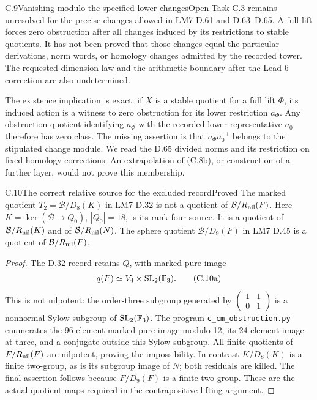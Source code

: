\begin{statement}{C.9}{Vanishing modulo the specified lower changes}{Open}
Task C.3 remains unresolved for the precise changes
allowed in LM7 D.61 and D.63--D.65.
A full lift forces zero obstruction after all changes
induced by its restrictions to stable quotients.
It has not been proved that those changes equal the
particular derivations, norm words, or homology
changes admitted by the recorded tower.
The requested dimension law and the arithmetic
boundary after the Lead 6 correction are also
undetermined.
\end{statement}

The existence implication is exact: if \(X\) is a
stable quotient for a full lift \(\Phi\), its induced
action is a witness to zero obstruction for its
lower restriction \(a_\Phi\).
Any obstruction quotient identifying \(a_\Phi\)
with the recorded lower representative \(a_0\)
therefore has zero class. The missing assertion is
that \(a_\Phi a_0^{-1}\) belongs to the stipulated
change module. We read the D.65 divided norms and
its restriction on fixed-homology corrections.
An extrapolation of (C.8b), or construction of a
further layer, would not prove this membership.

\begin{statement}{C.10}{The correct relative source for the excluded record}{Proved}
The marked quotient \(T_2=\mathcal B/D_8(K)\) in
LM7 D.32 is not a quotient of
\(\mathcal B/R_{\rm nil}(F)\).
Here \(K=\ker(\mathcal B\to Q_0)\), \(|Q_0|=18\),
is its rank-four source.
It is a quotient of \(\mathcal B/R_{\rm nil}(K)\)
and of \(\mathcal B/R_{\rm nil}(N)\).
The sphere quotient \(\mathcal B/D_9(F)\) in
LM7 D.45 is a quotient of
\(\mathcal B/R_{\rm nil}(F)\).
\end{statement}
\begin{proof}
The D.32 record retains \(Q\), with marked pure image
\[
 q(F)\simeq V_4\times{\rm SL}_2(\mathbb F_3).
 \tag{C.10a}
\]
This is not nilpotent: the order-three subgroup
generated by
\(\left(\begin{smallmatrix}1&1\\0&1\end{smallmatrix}\right)\)
is a nonnormal Sylow subgroup of
\({\rm SL}_2(\mathbb F_3)\).
The program \texttt{c\_cm\_obstruction.py} enumerates
the 96-element marked pure image modulo 12, its
24-element image at three, and a conjugate outside
this Sylow subgroup.
All finite quotients of \(F/R_{\rm nil}(F)\)
are nilpotent, proving the impossibility.
In contrast \(K/D_8(K)\) is a finite two-group,
as is its subgroup image of \(N\); both residuals
are killed. The final assertion follows because
\(F/D_9(F)\) is a finite two-group.
These are the actual quotient maps required in
the contrapositive lifting argument.
\end{proof}

